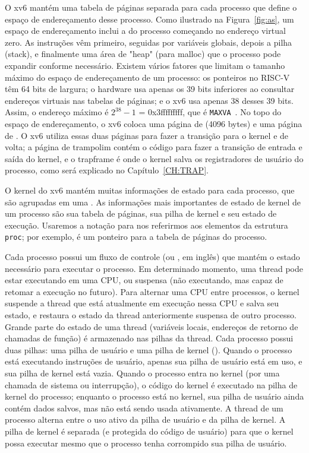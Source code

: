 O xv6 mantém uma tabela de páginas separada para cada processo que define o espaço de
endereçamento desse processo. Como ilustrado na
Figura~\ref{fig:as},
um espaço de endereçamento inclui a
do processo começando no endereço virtual zero. As instruções vêm primeiro,
seguidas por variáveis globais, depois a pilha (stack),
e finalmente uma área de "heap" (para malloc)
que o processo pode expandir conforme necessário.
Existem vários fatores que limitam o
tamanho máximo do espaço de endereçamento de um processo:
os ponteiros no RISC-V têm 64 bits de largura;
o hardware usa apenas os 39 bits inferiores ao
consultar endereços virtuais nas tabelas de páginas;
e o xv6 usa apenas 38 desses 39 bits.
Assim, o endereço máximo é $2^{38}-1$ =
0x3fffffffff, que é \lstinline{MAXVA}~.
No topo do espaço de endereçamento, o xv6 coloca
uma página de  (4096 bytes)
e uma página de . O xv6 utiliza essas duas páginas
para fazer a transição para o kernel e de volta;
a página de trampolim contém o código para fazer a transição de entrada e saída
do kernel, e o trapframe é onde o kernel salva
os registradores de usuário do processo,
como será explicado no Capítulo~\ref{CH:TRAP}.

O kernel do xv6 mantém muitas informações de estado para cada processo,
que são agrupadas em uma
.
As informações mais importantes de estado de kernel de um processo são sua
tabela de páginas, sua pilha de kernel e seu estado de execução.
Usaremos a notação
para nos referirmos aos elementos da estrutura
\lstinline{proc};
por exemplo,
 é um ponteiro para a tabela de páginas do processo.

Cada processo possui um fluxo de controle (ou
, em inglês) que mantém o estado necessário para executar o processo.
Em determinado momento, uma thread pode estar executando em uma CPU,
ou suspensa (não executando, mas capaz de retomar a execução
no futuro).
Para alternar uma CPU entre processos,
o kernel suspende a thread que está atualmente em execução nessa CPU
e salva seu estado,
e restaura o estado da thread anteriormente suspensa de outro processo.
Grande parte do estado de uma thread (variáveis locais, endereços de retorno de chamadas de função)
é armazenado nas pilhas da thread.
Cada processo possui duas pilhas: uma pilha de usuário e uma pilha de kernel
().
Quando o processo está executando instruções de usuário, apenas sua pilha de usuário
está em uso, e sua pilha de kernel está vazia.
Quando o processo entra no kernel (por uma chamada de sistema ou interrupção),
o código do kernel é executado na pilha de kernel do processo; enquanto
o processo está no kernel, sua pilha de usuário ainda contém dados salvos,
mas não está sendo usada ativamente.
A thread de um processo alterna entre o uso ativo da pilha de usuário
e da pilha de kernel. A pilha de kernel é separada (e protegida do
código de usuário) para que o kernel
possa executar mesmo que o processo tenha corrompido sua pilha de usuário.

